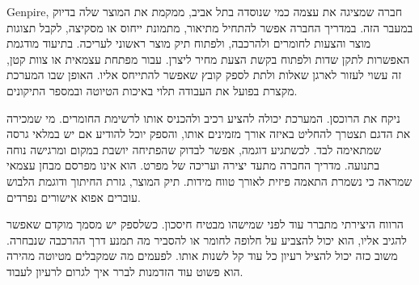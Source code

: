 


{\fontsize{14}{21.3}\selectfont

\textenglish{Genpire}, חברה שמציגה את עצמה כמי שנוסדה בתל אביב, ממקמת את המוצר שלה בדיוק במעבר הזה. במדריך החברה אפשר להתחיל מתיאור, מתמונת ייחוס או מסקיצה, לקבל תצוגות מוצר והצעות לחומרים ולהרכבה, ולפתוח תיק מוצר ראשוני לעריכה. בתיעוד מודגמת האפשרות לתקן שדות ולפתוח בקשת הצעת מחיר ליצרן. עבור מפתחת עצמאית או צוות קטן, זה עשוי לעזור לארגן שאלות ולתת לספק קובץ שאפשר להתייחס אליו. האופן שבו המערכת מקצרת בפועל את העבודה תלוי באיכות הטיוטה ובמספר התיקונים. 

ניקח את הרוכסן. המערכת יכולה להציע רכיב ולהכניס אותו לרשימת החומרים. מי שמכירה את הדגם תצטרך להחליט באיזה אורך מזמינים אותו, והספק יוכל להודיע אם יש במלאי גרסה שמתאימה לבד. לכשתגיע דוגמה, אפשר לבדוק שהפתיחה יושבת במקום ומרגישה נוחה בתנועה. מדריך החברה מתעד יצירה ועריכה של מפרט. הוא אינו מפרסם מבחן עצמאי שמראה כי נשמרת התאמה פיזית לאורך טווח מידות. תיק המוצר, גזרת החיתוך ודוגמת הלבוש עוברים אפוא אישורים נפרדים. 

הרווח היצירתי מתברר עוד לפני שמישהו מבטיח חיסכון. כשלספק יש מסמך מוקדם שאפשר להגיב אליו, הוא יכול להצביע על חלופה לחומר או להסביר מה תמנע דרך ההרכבה שנבחרה. משוב כזה יכול להציל רעיון כל עוד קל לשנות אותו. לפעמים מה שמקבלים מטיוטה מהירה הוא פשוט עוד הזדמנות לברר איך לגרום לרעיון לעבוד.

\par}
